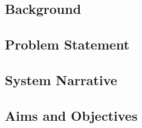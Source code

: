 \documentclass[../main.tex]{subfiles}
\begin{document}
\subsection{Background}

\subsection{Problem Statement}

\subsection{System Narrative}

\subsection{Aims and Objectives}
\end{document}
